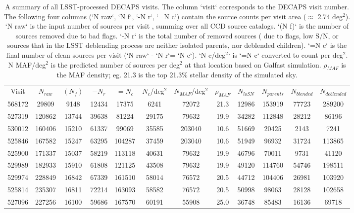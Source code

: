 \documentclass[DM,lsstdraft,toc,usenatbib]{lsstdoc}
\begin{document}
\begin{table}
\centering
\caption{A summary of all LSST-processed DECAPS visits. The column `visit` corresponds to the DECAPS visit number.  The following four columns (`N raw`,  `N f`, `-N r`,  `=N c`) contain the source counts  per visit area ($\approx$ 2.74 deg$^{2}$). `N raw` is the input number of sources per visit , summing over all CCD source catalogs. `(N f)` is the number of sources removed due to bad flags. `-N r` is the total number of removed sources ( due to flags, low S/N, or sources that in the LSST deblending process are neither isolated parents, nor deblended children). `=N c` is the final number of clean sources per  visit (`N raw` - `N r`= `N c`). `N c/deg$^{2}$` is `=N c` converted to count per deg$^{2}$. N MAF/deg$^{2}$ is the predicted number of sources per deg$^{2}$ at that location based on Galfast simulation. $\rho_{MAF}$ is the  MAF density; eg. 21.3 is the top 21.3\% stellar density of the simulated sky.}
\label{tab:lsst_summary}
\begin{tabular}{cccccccccccc}
Visit & $N_{raw}$ & $(N_{f})$ & $-N_{r}$ & $=N_{c}$ & $N_{c}$/deg$^{2}$ & $N_{MAF}$/deg$^{2}$ & $\rho_{MAF}$ & $N_{loSN}$ & $N_{parents}$ & $N_{blended}$ & $N_{deblended}$ \\
568172 & 29809 & 9148 & 12434 & 17375 & 6241 & 72072 & 21.3 & 12986 & 153919 & 77723 & 289200 \\
527319 & 120862 & 13744 & 39638 & 81224 & 29175 & 79632 & 19.9 & 34282 & 112848 & 28212 & 86196 \\
530012 & 160406 & 15210 & 61337 & 99069 & 35585 & 203040 & 10.6 & 51669 & 20425 & 2143 & 7241 \\
525846 & 167582 & 15247 & 63295 & 104287 & 37459 & 203040 & 10.6 & 51949 & 96932 & 31724 & 113865 \\
525900 & 171337 & 15037 & 58219 & 113118 & 40631 & 79632 & 19.9 & 46796 & 70011 & 9731 & 41120 \\
529989 & 182933 & 15910 & 61808 & 121125 & 43508 & 79632 & 19.9 & 49120 & 114760 & 54746 & 198511 \\
529974 & 228849 & 16842 & 67339 & 161510 & 58014 & 76572 & 20.5 & 44712 & 104406 & 26981 & 103920 \\
525814 & 235307 & 16811 & 72214 & 163093 & 58582 & 76572 & 20.5 & 50998 & 98063 & 28128 & 102658 \\
527096 & 227256 & 16100 & 59686 & 167570 & 60191 & 55908 & 25.0 & 36748 & 85483 & 16136 & 69718 \\

\end{tabular}
\end{table}
\end{document}
